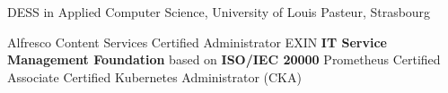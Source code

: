 %
%
%


\begin{scholarship}
					{DESS in Applied Computer Science, University of Louis Pasteur, Strasbourg}
\end{scholarship}

\begin{scholarship}
					{Alfresco Content Services Certified Administrator}
					{EXIN \textbf{IT Service Management Foundation} based on \textbf{ISO/IEC 20000}}
					{Prometheus Certified Associate}
					{Certified Kubernetes Administrator (CKA)}
\end{scholarship}
